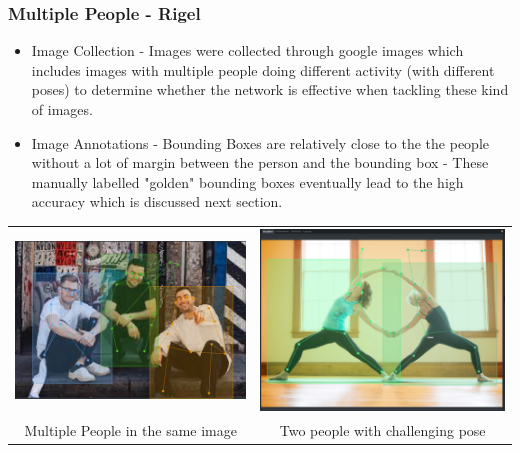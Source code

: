 \documentclass[a4paper,12pt]{article}
\begin{document}
\subsubsection{Multiple People - Rigel}
\begin{itemize}
    \item Image Collection - Images were collected through google images which includes images with multiple people doing different activity (with different poses)  to determine whether the network is effective when tackling these kind of images. 
    \item Image Annotations - Bounding Boxes are relatively close to the the people without a lot of margin between the person and the bounding box - These manually labelled "golden" bounding boxes eventually lead to the high accuracy which is discussed next section. 
\end{itemize}

\begin{center}
\begin{tabular}{cc}
\includegraphics[scale=0.2]{Multiple_people_3.png}
&
\includegraphics[scale=0.18]{Multiple_Poeple_Yoga.png}
\\
Multiple People in the same image & Two people with challenging pose
\end{tabular}
\end{center}
\end{document}
